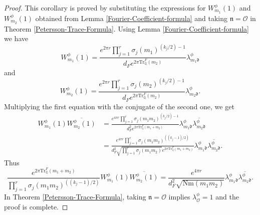 \documentclass[reqno]{amsart}
\theoremstyle{plain}
\theoremstyle{definition}
\theoremstyle{remark}
\def\Nr{\mathrm{Nm}}
\begin{document}
    \begin{proof}
    This corollary is proved by substituting the expressions for $W_{m_1}^\phi(1)$ and $W_{m_2}^\phi(1)$ obtained from  Lemma \ref{Fourier-Coefficient-formula} and taking $\mathfrak{n}=\mathcal{O}$ in Theorem \ref{Petersson-Trace-Formula}. Using  Lemma \ref{Fourier-Coefficient-formula}  we have
    $$ 
    W_{m_1}^\phi(1)=\frac{e^{2\pi r} \prod_{j=1}^r   \sigma_j(m_1)^{(k_j/2)-1}    }{d_Fe^{2\pi \mathrm{Tr}_{\mathbb{Q}}^F (m_2)}}\lambda^\phi_{m_1\mathfrak{d}}
    $$  
    and 
    $$ 
    W_{m_2}^\phi(1)=\frac{e^{2\pi r} \prod_{j=1}^r   \sigma_j(m_2)^{(k_j/2)-1}    }{d_Fe^{2\pi \mathrm{Tr}_{\mathbb{Q}}^F (m_2)}}\lambda^\phi_{m_2\mathfrak{d}}.
    $$ 
    Multiplying the first equation with the conjugate of the second one, we get 
    \begin{align*}
    W_{m_1}^\phi(1) \overline{ W_{m_2}^\phi(1)} &= \frac{e^{4\pi r}  \prod_{j=1}^r   \sigma_j(m_1m_2)^{(k_j/2)-1}}{d_F^2e^{2\pi \mathrm{Tr}_{\mathbb{Q}}^F (m_1+m_2)}} \lambda^\phi_{m_1\mathfrak{d}} \overline{\lambda^\phi_{m_2\mathfrak{d}}} \\
 &=\frac{e^{4\pi r}  \prod_{j=1}^r   \sigma_j(m_1m_2)^{((k_j-1)/2)}}{d_F^2  \sqrt{\prod_{j=1}^r   \sigma_j(m_1m_2)} e^{2\pi \mathrm{Tr}_{\mathbb{Q}}^F (m_1+m_2)}}\lambda^\phi_{m_1\mathfrak{d}} \overline{\lambda^\phi_{m_2\mathfrak{d}}}.
    \end{align*}
    Thus 
    $$
    \frac{e^{2\pi \mathrm{Tr}_{\mathbb{Q}}^F (m_1+m_2)}    }{\prod_{j=1}^r   \sigma_j(m_1m_2)^{((k_j-1)/2)}}  W_{m_1}^\phi(1)\overline{ W_{m_2}^\phi(1)} =\frac{  e^{4\pi r}  }{d_F^2 \sqrt{\Nr(m_1m_2)}} \lambda^\phi_{m_1\mathfrak{d}} \overline{\lambda^\phi_{m_2\mathfrak{d}} }.
    $$
 In Theorem \ref{Petersson-Trace-Formula}, taking $\mathfrak{n}=\mathcal{O}$ implies $\lambda^\phi_{\mathcal{O}}=1 $ 
    and the proof is complete. 
\end{proof}
    
\end{document}
